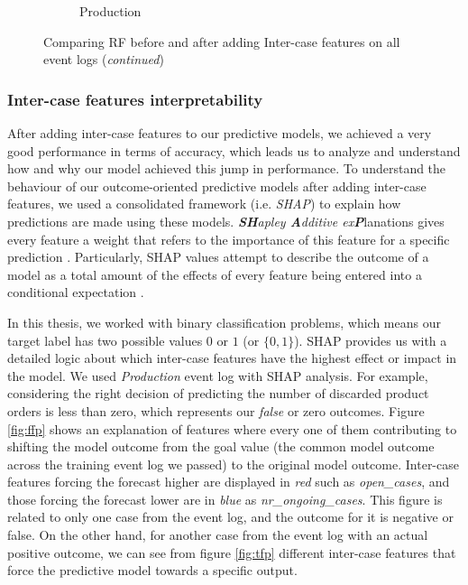 \begin{figure}[!htbp]
\begin{subfigure}{0.48\textwidth}
		\caption{Production} \label{fig:proi}
	\end{subfigure}\hspace*{\fill}
	\caption{Comparing RF before and after adding Inter-case features on all event logs (\textit{continued})}
\label{fig:interr3}
\end{figure}


\clearpage
\subsubsection{Inter-case features interpretability}

After adding inter-case features to our predictive models, we achieved a very good performance in terms of accuracy, which leads us to analyze and understand how and why our model achieved this jump in performance. To understand the behaviour of our outcome-oriented predictive models after adding inter-case features, we used a consolidated framework (i.e. \textit{SHAP}) to explain how predictions are made using these models. \textit{\textbf{SH}apley \textbf{A}dditive ex\textbf{P}}lanations gives every feature a weight that refers to the importance of this feature for a specific prediction \cite{lundberg2017unified}. Particularly, SHAP values attempt to describe the outcome of a model as a total amount of the effects of every feature being entered into a conditional expectation \cite{lundberg2018consistent}.


In this thesis, we worked with binary classification problems, which means our target label has two possible values $0$ or $1$ (or $\{0,1\}$). SHAP  provides us with a detailed logic about which inter-case features have the highest effect or impact in the model. We used \textit{Production} event log with SHAP analysis. For example, considering the right decision of predicting the number of discarded product orders is less than zero, which represents our \textit{false} or zero outcomes.  Figure \ref{fig:ffp} shows an explanation of features where every one of them contributing to shifting the model outcome from the goal value  (the common model outcome across the training event log we passed) to the original model outcome. Inter-case features forcing the forecast higher are displayed in \textit{red} such as \textit{open\_cases}, and those forcing the forecast lower are in \textit{blue} as \textit{nr\_ongoing\_cases}. This figure is related to only one case from the event log, and the outcome for it is negative or false. On the other hand, for another case from the event log with an actual positive outcome, we can see from figure \ref{fig:tfp} different inter-case features that force the predictive model towards a specific output. 

